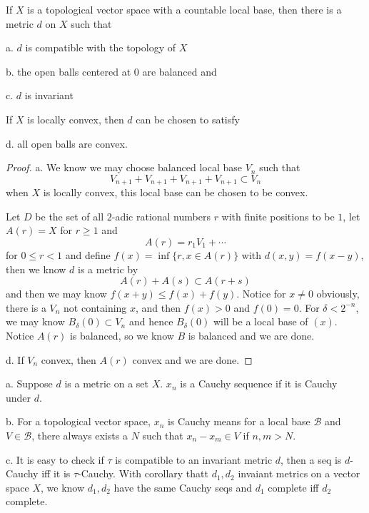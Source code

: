 \documentclass[lang=en, color=blue, ]{elegantbook}
\begin{document}
\begin{theorem}
    If $X$ is a topological vector space with a countable local base, then there is a metric $d$ on $X$ such that\par
    a. $d$ is compatible with the topology of $X$\par
    b. the open balls centered at $0$ are balanced and\par
    c. $d$ is invariant\par
    If $X$ is locally convex, then $d$ can be chosen to satisfy\par
    d. all open balls are convex.
\end{theorem}
\begin{proof}
    a. We know we may choose balanced local base $V_n$ such that
    \[V_{n+1}+V_{n+1}+V_{n+1}+V_{n+1} \subset V_n\]
    when $X$ is locally convex, this local base can be chosen to be convex.\par
    Let $D$ be the set of all $2$-adic rational numbers $r$ with finite positions to be $1$, let $A(r) = X$ for $r\geq 1$ and
    \[
    A(r) = r_1V_1 + \cdots
    \] 
    for $0\leq r < 1$
    and define $f(x) = \inf\{r, x\in A(r)\}$ with $d(x,y) = f(x-y)$, then we know $d$ is a metric by
    \[A(r)+A(s) \subset A(r+s)\]
    and then we may know $f(x+y) \leq f(x)+f(y)$. Notice for $x\neq 0$ obviously, there is a $V_{n}$ not containing $x$, and then $f(x) > 0$ and $f(0) = 0$. For $\delta < 2^{-n}$, we may know $B_{\delta}(0) \subset V_n$ and hence $B_{\delta} (0)$ will be a local base of $(x)$. Notice $A(r)$ is balanced, so we know $B$ is balanced and we are done.\par
    d. If $V_n$ convex, then $A(r)$ convex and we are done.  
\end{proof}

\begin{definition}
    a. Suppose $d$ is a metric on a set $X$. $x_n$ is a Cauchy sequence if it is Cauchy under $d$.\par
    b. For a topological vector space, $x_n$ is Cauchy means for a local base $\mathcal{B}$ and $V\in\mathcal{B}$, there always exists a $N$ such that $x_n-x_m \in V$ if $n,m>N$.\par
    c. It is easy to check if $\tau$ is compatible to an invariant metric $d$, then a seq is $d$-Cauchy iff it is $\tau$-Cauchy. With corollary thatt $d_1,d_2$ invaiant metrics on a vector space $X$, we know $d_1,d_2$ have the same Cauchy seqs and $d_1$ complete iff $d_2$ complete.
\end{definition}
\end{document}
